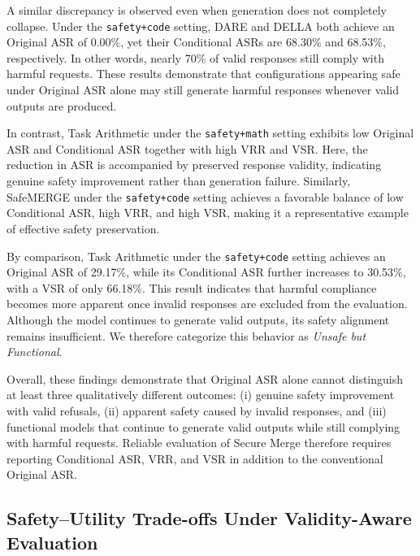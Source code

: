 \documentclass{article}
\begin{document}
A similar discrepancy is observed even when generation does not completely collapse. Under the \texttt{safety+code} setting, DARE and DELLA both achieve an Original ASR of 0.00\%, yet their Conditional ASRs are 68.30\% and 68.53\%, respectively. In other words, nearly 70\% of valid responses still comply with harmful requests. These results demonstrate that configurations appearing safe under Original ASR alone may still generate harmful responses whenever valid outputs are produced.

In contrast, Task Arithmetic under the \texttt{safety+math} setting exhibits low Original ASR and Conditional ASR together with high VRR and VSR. Here, the reduction in ASR is accompanied by preserved response validity, indicating genuine safety improvement rather than generation failure. Similarly, SafeMERGE under the \texttt{safety+code} setting achieves a favorable balance of low Conditional ASR, high VRR, and high VSR, making it a representative example of effective safety preservation.

By comparison, Task Arithmetic under the \texttt{safety+code} setting achieves an Original ASR of 29.17\%, while its Conditional ASR further increases to 30.53\%, with a VSR of only 66.18\%. This result indicates that harmful compliance becomes more apparent once invalid responses are excluded from the evaluation. Although the model continues to generate valid outputs, its safety alignment remains insufficient. We therefore categorize this behavior as \textit{Unsafe but Functional}.

Overall, these findings demonstrate that Original ASR alone cannot distinguish at least three qualitatively different outcomes: (i) genuine safety improvement with valid refusals, (ii) apparent safety caused by invalid responses, and (iii) functional models that continue to generate valid outputs while still complying with harmful requests. Reliable evaluation of Secure Merge therefore requires reporting Conditional ASR, VRR, and VSR in addition to the conventional Original ASR.

\color{black}
\fi

\subsection{Safety--Utility Trade-offs Under Validity-Aware Evaluation}
\end{document}
